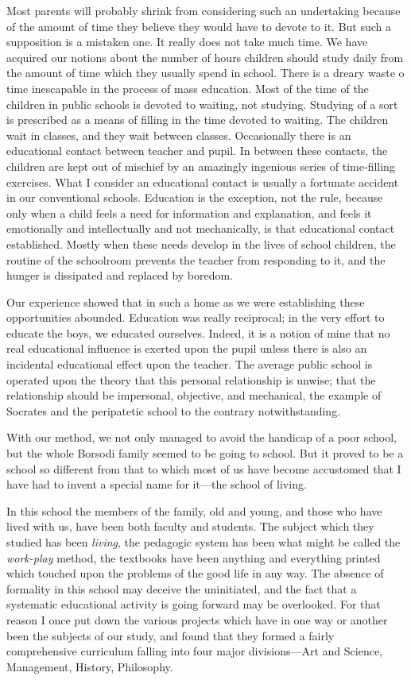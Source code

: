 \documentclass{book}
\begin{document}
Most parents will probably shrink from considering such an undertaking because of the amount of time they believe they would have to devote to it. But such a supposition is a mistaken one. It really does not take much time. We have acquired our notions about the number of hours children should study daily from the amount of time which they usually spend in school. There is a dreary waste o time inescapable in the process of mass education. Most of the time of the children in public schools is devoted to waiting, not studying. Studying of a sort is prescribed as a means of filling in the time devoted to waiting. The children wait in classes, and they wait between classes. Occasionally there is an educational contact between teacher and pupil. In between these contacts, the children are kept out of mischief by an amazingly ingenious series of time-filling exercises. What I consider an educational contact is usually a fortunate accident in our conventional schools. Education is the exception, not the rule, because only when a child feels a need for information and explanation, and feels it emotionally and intellectually and not mechanically, is that educational contact established. Mostly when these needs develop in the lives of school children, the routine of the schoolroom prevents the teacher from responding to it, and the hunger is dissipated and replaced by boredom.

Our experience showed that in such a home as we were establishing these opportunities abounded. Education was really reciprocal; in the very effort to educate the boys, we educated ourselves. Indeed, it is a notion of mine that no real educational influence is exerted upon the pupil unless there is also an incidental educational effect upon the teacher. The average public school is operated upon the theory that this personal relationship is unwise; that the relationship should be impersonal, objective, and mechanical, the example of Socrates and the peripatetic school to the contrary notwithstanding.

With our method, we not only managed to avoid the handicap of a poor school, but the whole Borsodi family seemed to be going to school. But it proved to be a school so different from that to which most of us have become accustomed that I have had to invent a special name for it—the school of living.

In this school the members of the family, old and young, and those who have lived with us, have been both faculty and students. The subject which they studied has been \emph{living}, the pedagogic system has been what might be called the \emph{work-play} method, the textbooks have been anything and everything printed which touched upon the problems of the good life in any way. The absence of formality in this school may deceive the uninitiated, and the fact that a systematic educational activity is going forward may be overlooked. For that reason I once put down the various projects which have in one way or another been the subjects of our study, and found that they formed a fairly comprehensive curriculum falling into four major divisions—Art and Science, Management, History, Philosophy.
\end{document}
